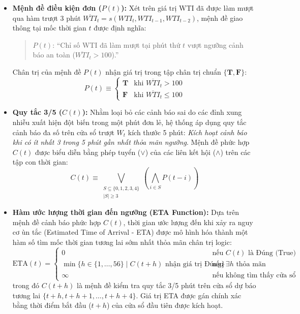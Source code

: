 \begin{itemize}
    \item \textbf{Mệnh đề điều kiện đơn ($P(t)$):} Xét trên giá trị WTI đã được làm mượt qua hàm trượt 3 phút $\overline{WTI}_t = s(WTI_t, WTI_{t-1}, WTI_{t-2})$, mệnh đề giao thông tại mốc thời gian $t$ được định nghĩa:
    \begin{quote}
        $P(t)$: ``Chỉ số WTI đã làm mượt tại phút thứ $t$ vượt ngưỡng cảnh báo an toàn ($\overline{WTI}_t > 100$).''
    \end{quote}
    Chân trị của mệnh đề $P(t)$ nhận giá trị trong tập chân trị chuẩn $\{\mathbf{T}, \mathbf{F}\}$:
    \begin{equation*}
        P(t) \equiv \begin{cases} 
        \mathbf{T} & \text{khi } \overline{WTI}_t > 100 \\ 
        \mathbf{F} & \text{khi } \overline{WTI}_t \le 100 
        \end{cases}
    \end{equation*}

    \item \textbf{Quy tắc 3/5 ($C(t)$):} Nhằm loại bỏ các cảnh báo sai do các đỉnh xung nhiễu xuất hiện đột biến trong một phút đơn lẻ, hệ thống áp dụng quy tắc cảnh báo đa số trên cửa sổ trượt $W_t$ kích thước 5 phút: \textit{Kích hoạt cảnh báo khi có ít nhất 3 trong 5 phút gần nhất thỏa mãn ngưỡng}. Mệnh đề phức hợp $C(t)$ được biểu diễn bằng phép tuyển ($\lor$) của các liên kết hội ($\land$) trên các tập con thời gian:
    \begin{equation*}
    C(t) \equiv \bigvee_{\substack{S \subseteq \{0,1,2,3,4\} \\ |S| \ge 3}} \left( \bigwedge_{i \in S} P(t-i) \right)
    \end{equation*}

    \item \textbf{Hàm ước lượng thời gian đến ngưỡng (ETA Function):}
    Dựa trên mệnh đề cảnh báo phức hợp $C(t)$, thời gian ước lượng đến khi xảy ra nguy cơ ùn tắc (Estimated Time of Arrival - ETA) được mô hình hóa thành một hàm số tìm mốc thời gian tương lai sớm nhất thỏa mãn chân trị logic:
    \begin{equation*}
        \text{ETA}(t) = \begin{cases}
    0 & \text{nếu } C(t) \text{ là Đúng (True)} \\
    \min \big\{ h \in \{1, \dots, 56\} \mid C(t+h) \text{ nhận giá trị Đúng} \big\} & \text{nếu } \exists h \text{ thỏa mãn} \\
    \infty & \text{nếu không tìm thấy cửa sổ thỏa mãn}
\end{cases}
    \end{equation*}
    trong đó $C(t+h)$ là mệnh đề kiểm tra quy tắc 3/5 phút trên cửa sổ dự báo tương lai $\{t+h, t+h+1, \dots, t+h+4\}$. Giá trị ETA được gán chính xác bằng thời điểm bắt đầu ($t+h$) của cửa sổ đầu tiên được kích hoạt.
\end{itemize}

